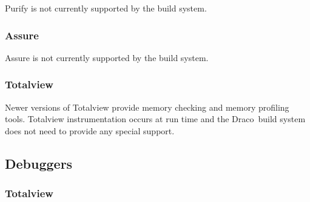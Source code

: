 \documentclass[11pt]{nmemo}
\newcommand{\comp}[1]{\normalfont\footnotesize\texttt{#1}\normalsize}
\newcommand{\draco}{{\normalfont\sffamily Draco}}
\begin{document}
Purify is not currently supported by the build system.




\subsubsection{Assure}

Assure is not currently supported by the build system.


\subsubsection{Totalview}

Newer versions of Totalview provide memory checking and memory
profiling tools.  Totalview instrumentation occurs at run time and the
\draco\ build system does not need to provide any special support.



\subsection{Debuggers}

\subsubsection{Totalview}
\end{document}
